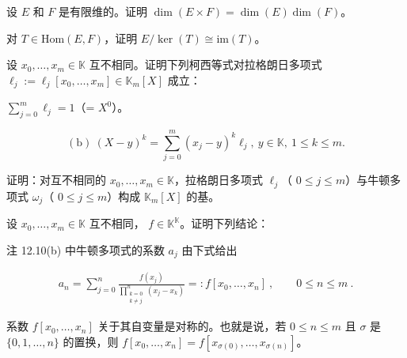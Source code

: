 \begin{exercises}
\item

设 $E$ 和 $F$ 是有限维的。证明 $\dim(E \times F) = \dim(E) \dim(F)$。

\item

对  $ T \in \mathrm{Hom}(E, F) $，证明  $ E/\ker(T) \cong \mathrm{im}(T) $。

\item

设  $ x_0, \ldots, x_m \in \mathbb{K} $ 互不相同。证明下列柯西等式对拉格朗日多项式  $ \ell_j := \ell_j[x_0, \ldots, x_m] \in \mathbb{K}_m[X] $ 成立：

\begin{items}
\item

$ \sum_{j=0}^{m} \ell_j = 1 $（=  $ X^0 $）。

\[
\mathrm{(b)}\ (X-y)^{k}=\textstyle\sum_{j=0}^{m}(x_{j}-y)^{k}\ell_{j},\ y\in\mathbb{K},\ 1\leq k\leq m.
\]
\end{items}

\item

证明：对互不相同的  $ x_0, \ldots, x_m \in \mathbb{K} $，拉格朗日多项式  $ \ell_j $（ $ 0 \leq j \leq m $）与牛顿多项式  $ \omega_j $（ $ 0 \leq j \leq m $）构成  $ \mathbb{K}_m[X] $ 的基。

\item

设  $ x_0, \ldots, x_m \in \mathbb{K} $ 互不相同， $ f \in \mathbb{K}^{\mathbb{K}} $。证明下列结论：

\begin{items}
\item

注 12.10(b) 中牛顿多项式的系数  $ a_{j} $ 由下式给出

\begin{equation*}
\begin{aligned}
a_{n}=\sum_{j=0}^{n}\frac{f(x_{j})}{\prod_{\substack{k=0\\ k\neq j}}^{n}(x_{j}-x_{k})}=:f[x_{0},\ldots,x_{n}]~,\qquad0\leq n\leq m~.
\end{aligned}
\end{equation*}
\item

系数  $ f[x_0, \ldots, x_n] $ 关于其自变量是对称的。也就是说，若  $ 0 \leq n \leq m $ 且  $ \sigma $ 是  $ \{0,1, \ldots, n\} $ 的置换，则  $ f[x_0, \ldots, x_n] = f[x_{\sigma(0)}, \ldots, x_{\sigma(n)}] $。


\end{items}
\end{exercises}
